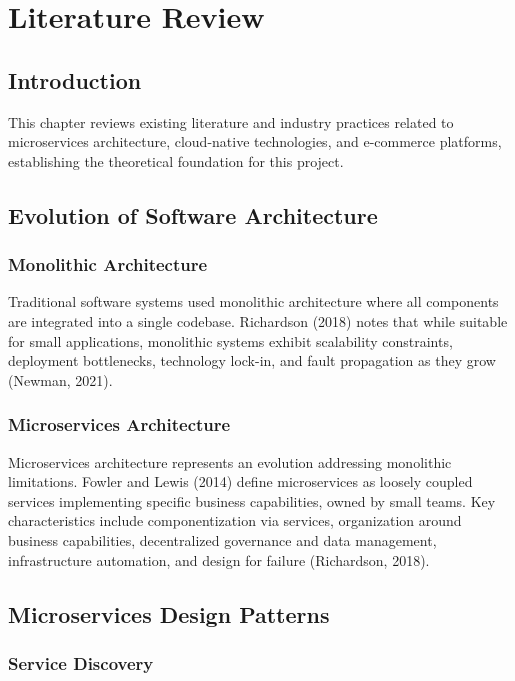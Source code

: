 \chapter{Literature Review}

\section{Introduction}

This chapter reviews existing literature and industry practices related to microservices architecture, cloud-native technologies, and e-commerce platforms, establishing the theoretical foundation for this project.

\section{Evolution of Software Architecture}

\subsection{Monolithic Architecture}

Traditional software systems used monolithic architecture where all components are integrated into a single codebase. Richardson (2018) notes that while suitable for small applications, monolithic systems exhibit scalability constraints, deployment bottlenecks, technology lock-in, and fault propagation as they grow (Newman, 2021).

\subsection{Microservices Architecture}

Microservices architecture represents an evolution addressing monolithic limitations. Fowler and Lewis (2014) define microservices as loosely coupled services implementing specific business capabilities, owned by small teams. Key characteristics include componentization via services, organization around business capabilities, decentralized governance and data management, infrastructure automation, and design for failure (Richardson, 2018).

\section{Microservices Design Patterns}

\subsection{Service Discovery}


